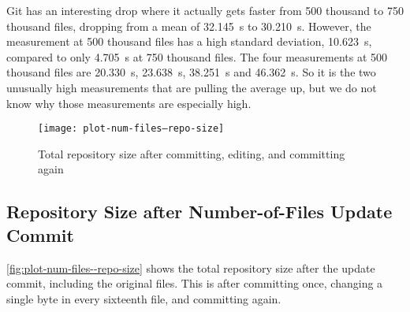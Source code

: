 

Git has an interesting drop where it actually gets faster from \num{500}
thousand to \num{750} thousand files, dropping from a mean of \SI{32.145}{\s} to
\SI{30.210}{\s}. However, the measurement at \num{500} thousand files has a high
standard deviation, \SI{10.623}{\s}, compared to only \SI{4.705}{\s} at
\num{750} thousand files. The four measurements at \num{500} thousand files are
\SI{20.330}{\s}, \SI{23.638}{\s}, \SI{38.251}{\s} and \SI{46.362}{\s}. So it is
the two unusually high measurements that are pulling the average up, but we do
not know why those measurements are especially high.

%


\begin{figure}[p]
    \caption{Total repository size after committing, editing, and committing again}
    \label{fig:plot-num-files--repo-size}
    \centering

    \explaindiskspaceplot

    \texttt{[image: plot-num-files--repo-size]}
\end{figure}

\cleardoublepage

\subsection{Repository Size after Number-of-Files Update Commit}

%


\autoref{fig:plot-num-files--repo-size} shows the total \gls{repository} size
after the update commit, including the original files. This is after committing
once, changing a single byte in every sixteenth file, and committing again.

